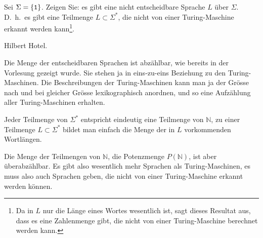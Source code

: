 Sei $\Sigma=\{{\tt 1}\}$.
Zeigen Sie: es gibt eine nicht entscheidbare
Sprache $L$ über $\Sigma$.
D.~h.~es gibt eine Teilmenge $L\subset \Sigma^*$, die nicht
von einer Turing-Maschine erkannt werden kann\footnote{Da in $L$
nur die Länge eines Wortes wesentlich ist, sagt dieses Resultat
aus, dass es eine Zahlenmenge gibt, die nicht von einer Turing-Maschine
berechnet werden kann.}.

\begin{hinweis}
Hilbert Hotel.
\end{hinweis}


\begin{loesung}
Die Menge der entscheidbaren Sprachen ist abzählbar, wie bereits in
der Vorlesung gezeigt wurde. Sie stehen ja
in eins-zu-eins Beziehung zu den Turing-Maschinen. Die Beschreibungen
der Turing-Maschinen kann man ja der Grösse nach und bei gleicher Grösse
lexikographisch anordnen, und so eine Auf\-zählung aller Turing-Maschinen
erhalten.

Jeder Teilmenge von $\Sigma^*$ entspricht eindeutig eine Teilmenge
von $\mathbb N$, zu einer Teilmenge $L\subset\Sigma^*$
bildet man einfach die Menge der in $L$ vorkommenden Wortlängen.

Die Menge der Teilmengen von $\mathbb N$, die Potenzmenge $P(\mathbb N)$,
ist aber überabzählbar.
Es gibt also wesentlich mehr Sprachen als Turing-Maschinen, es
muss also auch Sprachen geben, die nicht von einer Turing-Maschine
erkannt werden können.
\end{loesung}
